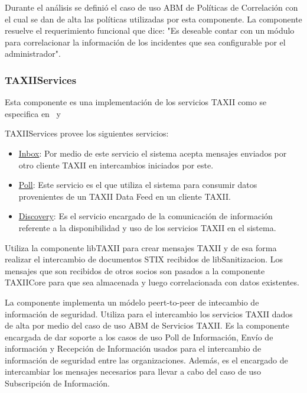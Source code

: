		Durante el análisis se definió el caso de uso ABM de Políticas de Correlación con el cual se dan de alta las políticas utilizadas por esta componente. La componente resuelve el requerimiento funcional que dice: "Es deseable contar con un módulo para correlacionar la información de los incidentes que sea configurable por el administrador".
	
	\subsubsection{TAXIIServices}
	Esta componente es una implementación de los servicios TAXII como se especifica en \cite{M13} \ y
		\ \cite{M14} 
	
	TAXIIServices provee los siguientes servicios:
	
	\begin{itemize}
		\item \underline{Inbox}: Por medio de este servicio el sistema acepta mensajes enviados por otro cliente
			TAXII en intercambios iniciados por este.
		\item \underline{Poll}: Este servicio es el que utiliza el sistema para consumir datos provenientes de un
			TAXII Data Feed en un cliente TAXII.
		\item \underline{Discovery}: Es el servicio encargado de la comunicación de información referente a la
			disponibilidad y uso de los servicios TAXII en el sistema.
	\end{itemize}
	
	\bigskip
	
	Utiliza la componente libTAXII para crear mensajes TAXII y de esa forma realizar el
		intercambio de documentos STIX recibidos de libSanitizacion. Los mensajes que son recibidos de otros socios son pasados
		a la componente TAXIICore para que sea almacenada y luego correlacionada con datos existentes.
	
	La componente implementa un módelo peert-to-peer de intecambio de información de seguridad. Utiliza para el intercambio los servicios TAXII dados de alta por medio del caso de uso ABM de Servicios TAXII. Es la componente encargada de dar soporte a los casos de uso Poll de Información, Envío de información y Recepción de Información usados para el intercambio de información de seguridad entre las organizaciones. Además, es el encargado de intercambiar los mensajes necesarios para llevar a cabo del caso de uso Subscripción de Información.
	
	\bigskip
	
